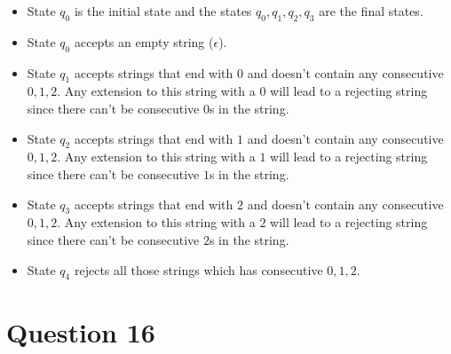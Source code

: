 \documentclass[12pt,a4paper]{article}
\begin{document}
\vspace{4cm}
\begin{itemize}
    \item State $q_0$ is the initial state and the states $q_0,q_1,q_2,q_3$ are the final states.
    \item State $q_0$ accepts an empty string ($\epsilon$).
    \item State $q_1$ accepts strings that end with $0$ and doesn't contain any consecutive $0,1,2$. Any extension to this string with a $0$ will lead to a rejecting string since there can't be consecutive $0$s in the string.
    \item State $q_2$ accepts strings that end with $1$ and doesn't contain any consecutive $0,1,2$. Any extension to this string with a $1$ will lead to a rejecting string since there can't be consecutive $1$s in the string.
    \item State $q_3$ accepts strings that end with $2$ and doesn't contain any consecutive $0,1,2$. Any extension to this string with a $2$ will lead to a rejecting string since there can't be consecutive $2$s in the string.
    \item State $q_4$ rejects all those strings which has consecutive $0,1,2$.
\end{itemize}

\section {Question 16}
\end{document}
